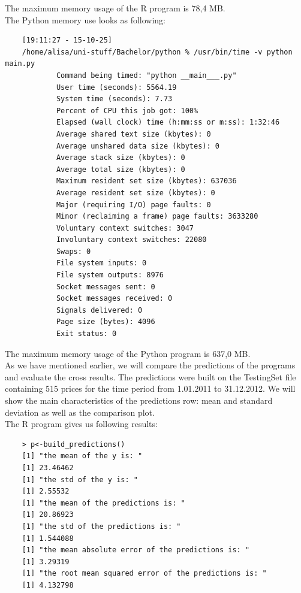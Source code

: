 \documentclass[
  twoside,
  11pt, a4paper,
  footinclude=true,
  headinclude=true,
  cleardoublepage=empty
]{scrreprt}
\begin{document}
    The maximum memory usage of the R program is 78,4 MB.\\
    The Python memory use looks as following:
    \begin{verbatim}
    [19:11:27 - 15-10-25] 
    /home/alisa/uni-stuff/Bachelor/python % /usr/bin/time -v python main.py
            Command being timed: "python __main___.py"
            User time (seconds): 5564.19
            System time (seconds): 7.73
            Percent of CPU this job got: 100%
            Elapsed (wall clock) time (h:mm:ss or m:ss): 1:32:46
            Average shared text size (kbytes): 0
            Average unshared data size (kbytes): 0
            Average stack size (kbytes): 0
            Average total size (kbytes): 0
            Maximum resident set size (kbytes): 637036
            Average resident set size (kbytes): 0
            Major (requiring I/O) page faults: 0
            Minor (reclaiming a frame) page faults: 3633280
            Voluntary context switches: 3047
            Involuntary context switches: 22080
            Swaps: 0
            File system inputs: 0
            File system outputs: 8976
            Socket messages sent: 0
            Socket messages received: 0
            Signals delivered: 0
            Page size (bytes): 4096
            Exit status: 0
    \end{verbatim}
    The maximum memory usage of the Python program is 637,0 MB.\\
    As we have mentioned earlier, we will compare the predictions of the programs and evaluate the cross results. The predictions were built on the TestingSet file containing 515 prices for the time period from 1.01.2011 to 31.12.2012. We will show the main characteristics of the predictions row: mean and standard deviation as well as the comparison plot.\\
    The R program gives us following results:
    \begin{verbatim}
    > p<-build_predictions()
    [1] "the mean of the y is: "
    [1] 23.46462
    [1] "the std of the y is: "
    [1] 2.55532
    [1] "the mean of the predictions is: "
    [1] 20.86923
    [1] "the std of the predictions is: "
    [1] 1.544088
    [1] "the mean absolute error of the predictions is: "
    [1] 3.29319
    [1] "the root mean squared error of the predictions is: "
    [1] 4.132798
    \end{verbatim}
\end{document}
